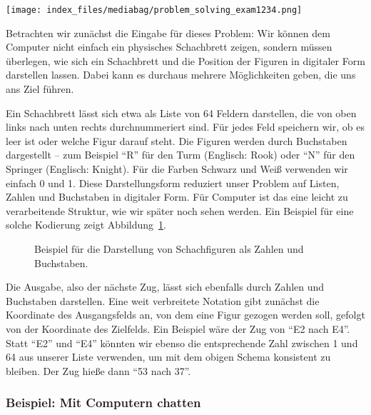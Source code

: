 \documentclass[
  letterpaper,
  DIV=11]{scrreprt}
\begin{document}
\begin{center}
\texttt{[image: index\_files/mediabag/problem\_solving\_exam1234.png]}
\end{center}

Betrachten wir zunächst die Eingabe für dieses Problem: Wir können dem
Computer nicht einfach ein physisches Schachbrett zeigen, sondern müssen
überlegen, wie sich ein Schachbrett und die Position der Figuren in
digitaler Form darstellen lassen. Dabei kann es durchaus mehrere
Möglichkeiten geben, die uns ans Ziel führen.

Ein Schachbrett lässt sich etwa als Liste von 64 Feldern darstellen, die
von oben links nach unten rechts durchnummeriert sind. Für jedes Feld
speichern wir, ob es leer ist oder welche Figur darauf steht. Die
Figuren werden durch Buchstaben dargestellt -- zum Beispiel ``R'' für
den Turm (Englisch: Rook) oder ``N'' für den Springer (Englisch:
Knight). Für die Farben Schwarz und Weiß verwenden wir einfach 0 und 1.
Diese Darstellungsform reduziert unser Problem auf Listen, Zahlen und
Buchstaben in digitaler Form. Für Computer ist das eine leicht zu
verarbeitende Struktur, wie wir später noch sehen werden. Ein Beispiel
für eine solche Kodierung zeigt
Abbildung~\ref{fig-coding-chess-figures}.

\begin{figure}


\caption{\label{fig-coding-chess-figures}Beispiel für die Darstellung
von Schachfiguren als Zahlen und Buchstaben.}

\end{figure}%

Die Ausgabe, also der nächste Zug, lässt sich ebenfalls durch Zahlen und
Buchstaben darstellen. Eine weit verbreitete Notation gibt zunächst die
Koordinate des Ausgangsfelds an, von dem eine Figur gezogen werden soll,
gefolgt von der Koordinate des Zielfelds. Ein Beispiel wäre der Zug von
``E2 nach E4''. Statt ``E2'' und ``E4'' könnten wir ebenso die
entsprechende Zahl zwischen 1 und 64 aus unserer Liste verwenden, um mit
dem obigen Schema konsistent zu bleiben. Der Zug hieße dann ``53 nach
37''.

\subsubsection{Beispiel: Mit Computern
chatten}\label{beispiel-mit-computern-chatten}
\end{document}
